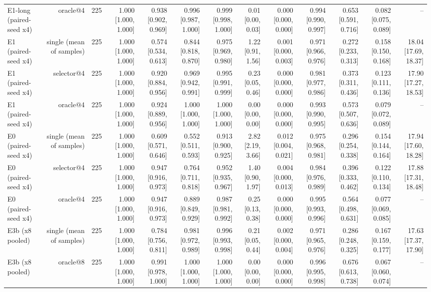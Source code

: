 \begin{table}[t]
\begin{tabular}{lrrrrrrrrrrrr}
E1-long (paired-seed x4) & oracle@4 & 225 & 1.000 [1.000, 1.000] & 0.938 [0.902, 0.969] & 0.996 [0.987, 1.000] & 0.999 [0.998, 1.000] & 0.01 [0.00, 0.03] & 0.000 [0.000, 0.000] & 0.994 [0.990, 0.997] & 0.653 [0.591, 0.716] & 0.082 [0.075, 0.089] & – \\
E1 (paired-seed x4) & single (mean of samples) & 225 & 1.000 [1.000, 1.000] & 0.574 [0.534, 0.613] & 0.844 [0.818, 0.870] & 0.975 [0.969, 0.980] & 1.22 [0.91, 1.56] & 0.001 [0.000, 0.003] & 0.971 [0.966, 0.976] & 0.272 [0.233, 0.313] & 0.158 [0.150, 0.168] & 18.04 [17.69, 18.37] \\
E1 (paired-seed x4) & selector@4 & 225 & 1.000 [1.000, 1.000] & 0.920 [0.884, 0.956] & 0.969 [0.942, 0.991] & 0.995 [0.991, 0.999] & 0.23 [0.05, 0.46] & 0.000 [0.000, 0.000] & 0.981 [0.977, 0.986] & 0.373 [0.311, 0.436] & 0.123 [0.111, 0.136] & 17.90 [17.27, 18.53] \\
E1 (paired-seed x4) & oracle@4 & 225 & 1.000 [1.000, 1.000] & 0.924 [0.889, 0.956] & 1.000 [1.000, 1.000] & 1.000 [1.000, 1.000] & 0.00 [0.00, 0.00] & 0.000 [0.000, 0.000] & 0.993 [0.990, 0.995] & 0.573 [0.507, 0.636] & 0.079 [0.072, 0.089] & – \\
E0 (paired-seed x4) & single (mean of samples) & 225 & 1.000 [1.000, 1.000] & 0.609 [0.571, 0.646] & 0.552 [0.511, 0.593] & 0.913 [0.900, 0.925] & 2.82 [2.19, 3.66] & 0.012 [0.004, 0.021] & 0.975 [0.968, 0.981] & 0.296 [0.254, 0.338] & 0.154 [0.144, 0.164] & 17.94 [17.60, 18.28] \\
E0 (paired-seed x4) & selector@4 & 225 & 1.000 [1.000, 1.000] & 0.947 [0.916, 0.973] & 0.764 [0.711, 0.818] & 0.952 [0.935, 0.967] & 1.40 [0.90, 1.97] & 0.004 [0.000, 0.013] & 0.984 [0.976, 0.989] & 0.396 [0.333, 0.462] & 0.122 [0.110, 0.134] & 17.88 [17.31, 18.48] \\
E0 (paired-seed x4) & oracle@4 & 225 & 1.000 [1.000, 1.000] & 0.947 [0.916, 0.973] & 0.889 [0.849, 0.929] & 0.987 [0.981, 0.992] & 0.25 [0.13, 0.38] & 0.000 [0.000, 0.000] & 0.995 [0.993, 0.996] & 0.564 [0.498, 0.631] & 0.077 [0.069, 0.085] & – \\
E3b (x8 pooled) & single (mean of samples) & 225 & 1.000 [1.000, 1.000] & 0.784 [0.756, 0.811] & 0.981 [0.972, 0.989] & 0.996 [0.993, 0.998] & 0.21 [0.05, 0.44] & 0.002 [0.000, 0.004] & 0.971 [0.965, 0.976] & 0.286 [0.248, 0.325] & 0.167 [0.159, 0.177] & 17.63 [17.37, 17.90] \\
E3b (x8 pooled) & oracle@8 & 225 & 1.000 [1.000, 1.000] & 0.991 [0.978, 1.000] & 1.000 [1.000, 1.000] & 1.000 [1.000, 1.000] & 0.00 [0.00, 0.00] & 0.000 [0.000, 0.000] & 0.996 [0.995, 0.998] & 0.676 [0.613, 0.738] & 0.067 [0.060, 0.074] & – \\

\end{tabular}
\end{table}
